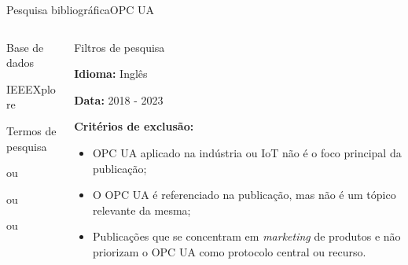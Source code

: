\documentclass{uspBeamer}
\begin{document}
    \begin{frame}{Pesquisa bibliográfica}{OPC UA}
        \begin{columns}
            \begin{column}{0.4\textwidth}
                \begin{wideitemize}
                    \item Base de dados
                    \begin{wideitemize}
                        \item IEEEXplore
                    \end{wideitemize}
                    \item Termos de pesquisa
                    \begin{wideitemize}
                        \item {} ou
                        \item {} ou
                        \item {} ou
                        \item {}
                    \end{wideitemize}
                \end{wideitemize}
            \end{column}
            \begin{column}{0.6\textwidth}
                \begin{wideitemize}
                    \item Filtros de pesquisa
                    \begin{wideitemize}
                        \item \textbf{Idioma:} Inglês
                        \item \textbf{Data:} 2018 - 2023
                        \item \textbf{Critérios de exclusão:}
                        \begin{itemize}
                            \item OPC UA aplicado na indústria ou IoT não é o foco principal da publicação;
                            \item O OPC UA é referenciado na publicação, mas não é um tópico relevante da mesma;
                            \item Publicações que se concentram em \textit{marketing} de produtos e não priorizam o OPC UA como protocolo central ou recurso.
                        \end{itemize}

\end{wideitemize}
\end{wideitemize}
\end{column}
\end{columns}
\end{frame}
\end{document}
